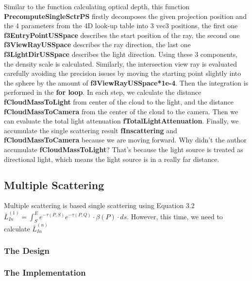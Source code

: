 Similar to the function calculating optical depth, this function \textbf{PrecomputeSingleSctrPS} firstly decomposes the given projection position and the 4 parameters from the 4D look-up table into 3 vec3 positions, the first one \textbf{f3EntryPointUSSpace} describes the start position of the ray, the second one \textbf{f3ViewRayUSSpace} describes the ray direction, the last one \textbf{f3LightDirUSSpace} describes the light direction. Using these 3 components, the density scale is calculated. Similarly, the intersection view ray is evaluated carefully avoiding the precision issues by moving the starting point slightly into the sphere by the amount of \textbf{f3ViewRayUSSpace*1e-4}. Then the integration is performed in the \textbf{for loop}. In each step, we calculate the distance \textbf{fCloudMassToLight} from center of the cloud to the light, and the distance \textbf{fCloudMassToCamera} from the center of the cloud to the camera. Then we can evaluate the total light attenuation \textbf{fTotalLightAttenuation}. Finally, we accumulate the single scattering result \textbf{fInscattering} and \textbf{fCloudMassToCamera} because we are moving forward. Why didn't the author accumulate \textbf{fCloudMassToLight}? That's because the light source is treated as directional light, which means the light source is in a really far distance.

\subsection{Multiple Scattering}
Multiple scattering is based single scattering using Equation 3.2 $\bar{L}^{(1)}_{In} = \int_{S}^{E}e^{-\tau(P,S)}e^{-\tau(P,Q)} \cdot \beta(P) \cdot ds$. However, this time, we need to calculate $\bar{L}^{(n)}_{In}$
\subsubsection{The Design}
\subsubsection{The Implementation}